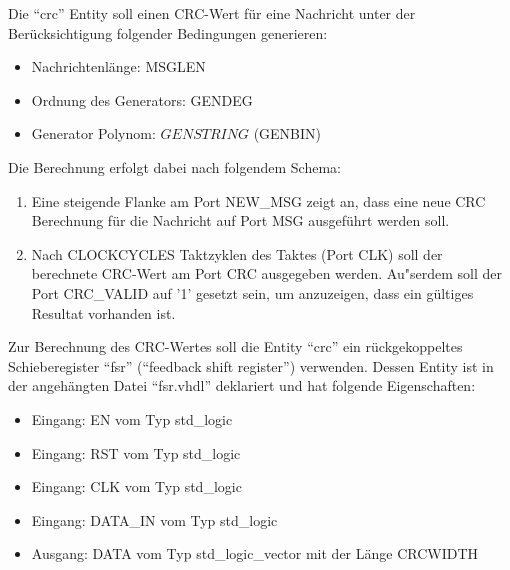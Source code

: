 \documentclass[a4paper,12pt]{article}
\begin{document}
Die "`crc"' Entity soll einen CRC-Wert f\"ur eine Nachricht unter der Ber\"ucksichtigung folgender Bedingungen generieren:
\begin{itemize}
\item Nachrichtenl\"ange: {{MSGLEN}}
\item Ordnung des Generators: {{GENDEG}}
\item Generator Polynom: ${{GENSTRING}}$ ({{GENBIN}})
\end{itemize}
Die Berechnung erfolgt dabei nach folgendem Schema:
\begin{enumerate}
    \item Eine steigende Flanke am Port NEW\_MSG zeigt an, dass eine neue CRC Berechnung f\"ur die Nachricht auf Port MSG ausgef\"uhrt werden soll.
    \item Nach {{CLOCKCYCLES}} Taktzyklen des Taktes (Port CLK) soll der berechnete CRC-Wert am Port CRC ausgegeben werden. Au"serdem soll der Port CRC\_VALID auf '1' gesetzt sein, um anzuzeigen, dass ein g\"ultiges Resultat vorhanden ist.
\end{enumerate}

\newpage

Zur Berechnung des CRC-Wertes soll die Entity "`crc"' ein r\"uckgekoppeltes Schieberegister "`fsr"' ("`feedback shift register"') verwenden. Dessen Entity ist in der angeh\"angten Datei "`fsr.vhdl"' deklariert und hat folgende Eigenschaften:
\begin{itemize}
    \item Eingang: EN vom Typ std\_logic
    \item Eingang: RST vom Typ std\_logic
    \item Eingang: CLK vom Typ std\_logic
    \item Eingang: DATA\_IN vom Typ std\_logic
    \item Ausgang: DATA vom Typ std\_logic\_vector mit der L\"ange {{CRCWIDTH}}
\end{itemize}

\vspace{0.5cm}
\end{document}
